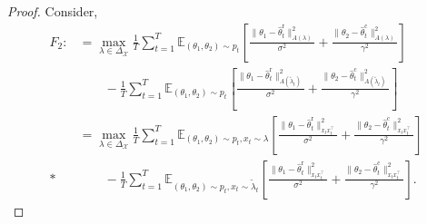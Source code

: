 \documentclass[10pt,a4paper]{amsart}
\newcommand{\hthetact}{\hat{\theta}_t^{\mathrm{c}}}
\newcommand{\hthetart}{\hat{\theta}_t^{\mathrm{r}}}
\begin{document}
\begin{proof}
Consider,
    \begin{align*}
    F_2:&=\max_{\lambda \in \Delta_{\mathcal{X}}} \frac{1}{T} 
\sum_{t=1}^{T} \mathbb{E}_{(\theta_1, \theta_2) \sim p_t} 
\left[ \frac{\|\theta_1 - \hthetart\|_{A(\lambda)}^2}{\sigma^2} 
+ \frac{\|\theta_2 - \hthetact\|_{A(\lambda)}^2}{\gamma^2} \right] \\ 
&\qquad 
- \frac{1}{T} \sum_{t=1}^{T} \mathbb{E}_{(\theta_1, \theta_2) \sim p_t} 
\left[ \frac{\|\theta_1 - \hthetart\|_{A(\tilde{\lambda}_t)}^2}{\sigma^2} 
+ \frac{\|\theta_2 - \hthetact\|_{A(\tilde{\lambda}_t)}^2}{\gamma^2} \right] 
\\&=\max_{\lambda \in \Delta_{\mathcal{X}}} \frac{1}{T} 
\sum_{t=1}^{T} \mathbb{E}_{(\theta_1, \theta_2) \sim p_t, x_t\sim \lambda} 
\left[ \frac{\|\theta_1 - \hthetart\|_{x_t x_t^\top}^2}{\sigma^2} 
+ \frac{\|\theta_2 - \hthetact\|_{x_t x_t^\top}^2}{\gamma^2} \right] \\* 
&\qquad 
- \frac{1}{T} \sum_{t=1}^{T} \mathbb{E}_{(\theta_1, \theta_2) \sim p_t, x_t\sim \tilde{\lambda}_t} 
\left[ \frac{\|\theta_1 - \hthetart\|_{x_t x_t^\top}^2}{\sigma^2} 
+ \frac{\|\theta_2 - \hthetact\|_{x_t x_t^\top}^2}{\gamma^2} \right]. \nonumber
\end{align*}



\end{proof}
\end{document}
